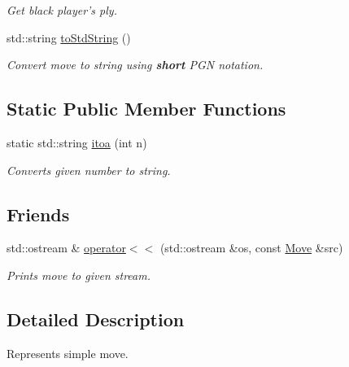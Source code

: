 \begin{DoxyCompactItemize}
\begin{DoxyCompactList}\small\item\em Get black player's ply. \item\end{DoxyCompactList}\item 
std::string \hyperlink{classpgn_1_1Move_a0f09e103caca4e9484779d67e4ff2e54}{toStdString} ()
\begin{DoxyCompactList}\small\item\em Convert move to string using {\bfseries short} PGN notation. \item\end{DoxyCompactList}\end{DoxyCompactItemize}
\subsection*{Static Public Member Functions}
\begin{DoxyCompactItemize}
\item 
static std::string \hyperlink{classpgn_1_1Move_ab69fb9cbd8ad8107e6d6264a66cf74af}{itoa} (int n)
\begin{DoxyCompactList}\small\item\em Converts given number to string. \item\end{DoxyCompactList}\end{DoxyCompactItemize}
\subsection*{Friends}
\begin{DoxyCompactItemize}
\item 
std::ostream \& \hyperlink{classpgn_1_1Move_a59221be82ec792c0a15addf8746a667c}{operator$<$$<$} (std::ostream \&os, const \hyperlink{classpgn_1_1Move}{Move} \&src)
\begin{DoxyCompactList}\small\item\em Prints move to given stream. \item\end{DoxyCompactList}\end{DoxyCompactItemize}


\subsection{Detailed Description}
Represents simple move. 

